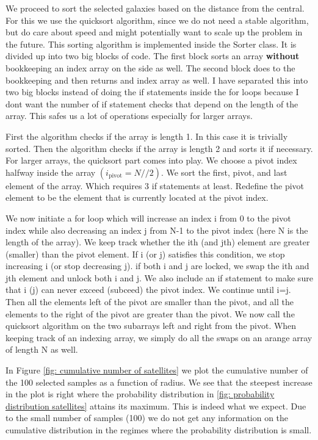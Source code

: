 \documentclass{article}
\begin{document}
We proceed to sort the selected galaxies based on the distance from the central.
For this we use the quicksort algorithm, since we do not need a stable algorithm, but do care about speed and might 
potentially want to scale up the problem in the future. 
This sorting algorithm is implemented inside the Sorter class.
It is divided up into two big blocks of code. The first block sorts an array \textbf{without} bookkeeping an index array 
on the side as well.
The second block does to the bookkeeping and then returns and index array as well.
I have separated this into two big blocks instead of doing the if statements inside the for loops because 
I dont want the number of if statement checks that depend on the length of the array. This safes us a lot of operations
especially for larger arrays.

First the algorithm checks if the array is length 1. In this case it is trivially sorted.
Then the algorithm checks if the array is length 2 and sorts it if necessary.
For larger arrays, the quicksort part comes into play.
We choose a pivot index halfway inside the array $(i_\mathrm{pivot} = N//2)$.
We sort the first, pivot, and last element of the array. Which requires 3 if statements at least.
Redefine the pivot element to be the element that is currently located at the pivot index.

We now initiate a for loop which will increase an index i from 0 to the pivot index while also 
decreasing an index j from N-1 to the pivot index (here N is the length of the array).
We keep track whether the ith (and jth) element are greater (smaller) than the pivot element. 
If i (or j) satisfies this condition, we stop increasing i (or stop decreasing j).
if both i and j are locked, we swap the ith and jth element and unlock both i and j.
We also include an if statement to make sure that i (j) can never exceed (subceed) the pivot index.
We continue until i=j. Then all the elements left of the pivot are smaller than the pivot, and all the elements to 
the right of the pivot are greater than the pivot.
We now call the quicksort algorithm on the two subarrays left and right from the pivot. 
When keeping track of an indexing array, we simply do all the swaps on an arange array of length N as well.

In Figure \ref{fig: cumulative number of satellites} we plot the cumulative number of the 100 selected samples
as a function of radius. We see that the steepest increase in the plot is right where the probability distribution 
in \ref{fig: probability distribution satellites} attains its maximum. This is indeed what we expect.
Due to the small number of samples (100) we do not get any information on the cumulative distribution
in the regimes where the probability distribution is small.
\end{document}
